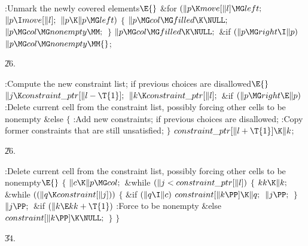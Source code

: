 \B{}:Unmark the newly covered elements\X${}\E{}$\6
\&{for} ${}(\|p\K\\{move}[\|l]\MG\\{left};{}$ ${}\|p\I\\{move}[\|l];{}$ ${}\|p%
\K\|p\MG\\{left}){}$\5
${}\{{}$\1\6
${}\|p\MG\\{col}\MG\\{filled}\K\NULL;{}$\6
${}\|p\MG\\{col}\MG\\{nonempty}\MM;{}$\6
\4${}\}{}$\2\6
${}\|p\MG\\{col}\MG\\{filled}\K\NULL;{}$\6
\&{if} ${}(\|p\MG\\{right}\I\|p){}$\1\5
${}\|p\MG\\{col}\MG\\{nonempty}\MM{}$;\2\par
\U26.\fi

\B{}:Compute the new constraint list;  if previous choices are disallowed\X${}\E{}$\6
$\|j\K\\{constraint\_ptr}[\|l-\T{1}];{}$\6
${}\|k\K\\{constraint\_ptr}[\|l];{}$\6
\&{if} ${}(\|p\MG\\{right}\E\|p){}$\1\5
:Delete current cell from the constraint list, possibly forcing other cells
to be nonempty\X\2\6
\&{else}\5
${}\{{}$\1\6
:Add new constraints;  if previous choices are
disallowed\X;\6
:Copy former constraints that are still unsatisfied\X;\6
\4${}\}{}$\2\6
${}\\{constraint\_ptr}[\|l+\T{1}]\K\|k{}$;\par
\U26.\fi

\B{}:Delete current cell from the constraint list,
possibly forcing other cells to be nonempty\X${}\E{}$\6
${}\{{}$\1\6
${}\|c\K\|p\MG\\{col};{}$\6
\&{while} ${}(\|j<\\{constraint\_ptr}[\|l]){}$\5
${}\{{}$\1\6
${}\\{kk}\K\|k;{}$\6
\&{while} ${}((\|q\K\\{constraint}[\|j])){}$\5
${}\{{}$\1\6
\&{if} ${}(\|q\I\|c){}$\1\5
${}\\{constraint}[\|k\PP]\K\|q;{}$\2\6
${}\|j\PP;{}$\6
\4${}\}{}$\2\6
${}\|j\PP;{}$\6
\&{if} ${}(\|k\E\\{kk}+\T{1}){}$\1\5
:Force  to be nonempty\X\2\6
\&{else}\1\5
${}\\{constraint}[\|k\PP]\K\NULL;{}$\2\6
\4${}\}{}$\2\6
\4${}\}{}$\2\par
\U34.\fi

